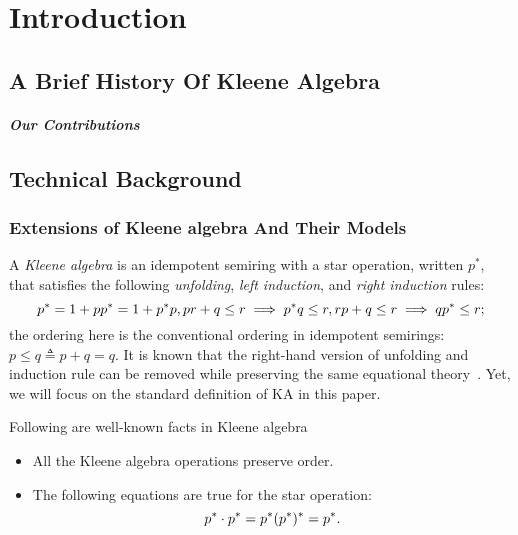 \chapter{Introduction}
\label{chapter:introduction}
\thispagestyle{myheadings}

\section{A Brief History Of Kleene Algebra}
\label{sec:history}





\paragraph{Our Contributions}

\section{Technical Background}

\subsection{Extensions of Kleene algebra And Their Models}

A \emph{Kleene algebra} is an idempotent semiring with a star operation, written
$p^*$, that satisfies the following \emph{unfolding}, \emph{left induction},
and \emph{right induction} rules:
\[
    p^* = 1 + p p^* = 1 + p^* p, \\
    p r + q  \leq  r  \implies  p^* q  \leq  r, \\
    r p + q  \leq  r  \implies  q p^*  \leq  r;
\]
the ordering here is the conventional ordering in idempotent semirings: \(p  \leq  q  \triangleq  p + q = q.\)
It is known that the right-hand version of unfolding and induction rule 
can be removed while preserving the same equational theory~\cite{Kozen_Silva_2020}.
Yet, we will focus on the standard definition of KA in this paper.
\begin{lemma}\label{the: well known fact about KA}
    Following are well-known facts in Kleene algebra
    \begin{itemize}
        \item All the Kleene algebra operations preserve order.
        \item The following equations are true for the star operation:
              \[ p^*  \cdot  p^* = p^* \\ (p^*)^* = p^*.\]
    \end{itemize}
\end{lemma}

